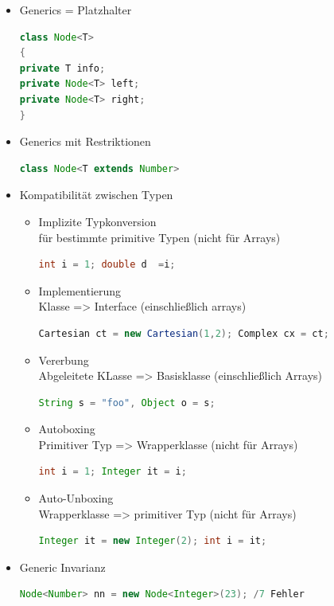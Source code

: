 \begin{itemize}
	\item Generics = Platzhalter 
	\begin{lstlisting}[language=JAVA]
class Node<T>
{
private T info;
private Node<T> left;
private Node<T> right;
}
\end{lstlisting}
	\item Generics mit Restriktionen
	\begin{lstlisting}[language=JAVA]
	class Node<T extends Number>
	\end{lstlisting}

\item Kompatibilität zwischen Typen 
	\begin{itemize}
	\item Implizite Typkonversion \\ für bestimmte primitive Typen (nicht für Arrays)
	\begin{lstlisting}[language=JAVA]
	int i = 1; double d  =i;
	\end{lstlisting}
\item Implementierung\\
Klasse => Interface (einschließlich arrays)
	\begin{lstlisting}[language=JAVA]
	Cartesian ct = new Cartesian(1,2); Complex cx = ct;
	\end{lstlisting}
\item Vererbung \\ Abgeleitete KLasse => Basisklasse (einschließlich Arrays)
	\begin{lstlisting}[language=JAVA]
	String s = "foo", Object o = s;
	\end{lstlisting}
\item Autoboxing \\ Primitiver Typ => Wrapperklasse (nicht für Arrays)
	\begin{lstlisting}[language=JAVA]
	int i = 1; Integer it = i;
	\end{lstlisting}
\item Auto-Unboxing \\ Wrapperklasse => primitiver Typ (nicht für Arrays)
	\begin{lstlisting}[language=JAVA]
	Integer it = new Integer(2); int i = it;
	\end{lstlisting}
\end{itemize}
\item Generic Invarianz
\begin{lstlisting}[language=JAVA]
Node<Number> nn = new Node<Integer>(23); /7 Fehler

\end{lstlisting}
\end{itemize}

